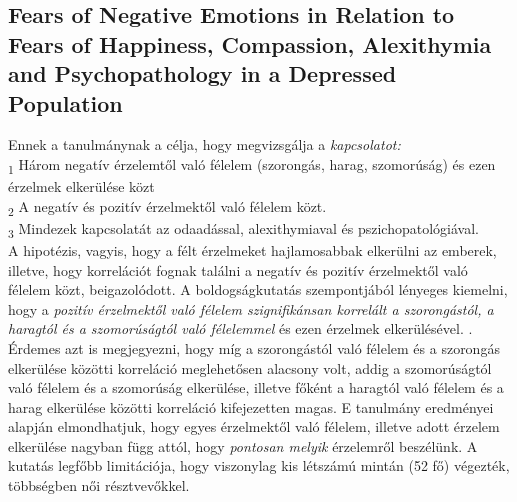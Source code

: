\subsection{Fears of Negative Emotions in Relation to Fears of Happiness, Compassion,
	Alexithymia and Psychopathology in a Depressed Population \cite{gilbert_2014}}
 Ennek a tanulmánynak a célja, hogy megvizsgálja a \textit{kapcsolatot:}\\
 \textsubscript{1} Három negatív érzelemtől való félelem (szorongás, harag, szomorúság) és ezen érzelmek elkerülése közt \\
 \textsubscript{2} A negatív és pozitív érzelmektől való félelem közt.\\
 \textsubscript{3} Mindezek kapcsolatát az odaadással, alexithymiaval és pszichopatológiával.\\
 A hipotézis, vagyis, hogy a félt érzelmeket hajlamosabbak elkerülni az emberek, illetve, hogy korrelációt fognak találni a negatív és pozitív érzelmektől való félelem közt, beigazolódott. A boldogságkutatás szempontjából lényeges kiemelni, hogy a \textit{pozitív érzelmektől való félelem szignifikánsan korrelált a szorongástól, a haragtól és a szomorúságtól való félelemmel} és ezen érzelmek elkerülésével. \cite{gilbert_2014}. Érdemes azt is megjegyezni, hogy míg a szorongástól való félelem és a szorongás elkerülése közötti korreláció meglehetősen alacsony volt, addig a szomorúságtól való félelem és a szomorúság elkerülése, illetve főként a haragtól való félelem és a harag elkerülése közötti korreláció kifejezetten magas\cite{gilbert_2014}. E tanulmány eredményei alapján elmondhatjuk, hogy egyes érzelmektől való félelem, illetve adott érzelem elkerülése nagyban függ attól, hogy \textit{pontosan melyik} érzelemről beszélünk. A kutatás legfőbb limitációja, hogy viszonylag kis létszámú mintán (52 fő) végezték, többségben női résztvevőkkel.
 
